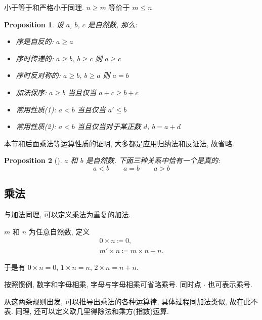 \documentclass[UTF8]{ctexart}
\theoremstyle{mystyle}
\newtheorem{proposition}{Proposition}[section]
\theoremstyle{myremark}
\theoremstyle{plain}
\begin{document}
小于等于和严格小于同理. $ n \geqslant m $ 等价于 $ m \leqslant n $. 

\begin{proposition}
    设 $ a $, $ b $, $ c $ 是自然数, 那么:
    \begin{itemize}
        \item 序是自反的: $ a \geqslant a $
        \item 序时传递的: $ a \geqslant b $, $ b \geqslant c $ 则 $ a \geqslant c $
        \item 序时反对称的: $ a \geqslant b $, $ b \geqslant a $ 则 $ a = b $
        \item 加法保序: $ a \geqslant b $ 当且仅当 $ a + c \geqslant b + c $
        \item 常用性质{\rm(1)}: $ a < b $ 当且仅当 $ a' \leqslant b $
        \item 常用性质{\rm(2)}: $ a < b $ 当且仅当对于某正数 $ d $, $ b = a + d $
    \end{itemize}
\end{proposition}

本节和后面乘法等运算性质的证明, 大多都是应用归纳法和反证法, 故省略.

\begin{proposition}[]
    $ a $ 和 $ b $ 是自然数. 下面三种关系中恰有一个是真的:
    \[ a < b \qquad a = b \qquad a > b \]
\end{proposition}



\subsection{乘法}
与加法同理, 可以定义乘法为重复的加法.
\begin{definition}
    $ m $ 和 $ n $ 为任意自然数, 定义
    \[ 
        \begin{array}{c}
            0 \times n \coloneqq 0, \\
            m' \times n \coloneqq m \times n + n.
        \end{array}    
    \]
\end{definition}

于是有 $ 0 \times n = 0 $, $ 1 \times n = n $, $ 2 \times n = n + n $.

按照惯例, 数字和字母相乘, 字母与字母相乘可省略乘号. 同时点 $ \cdot $ 也可表示乘号.

从这两条规则出发, 可以推导出乘法的各种运算律, 具体过程同加法类似, 故在此不表. 同理, 还可以定义欧几里得除法和乘方(指数)运算.
\end{document}
